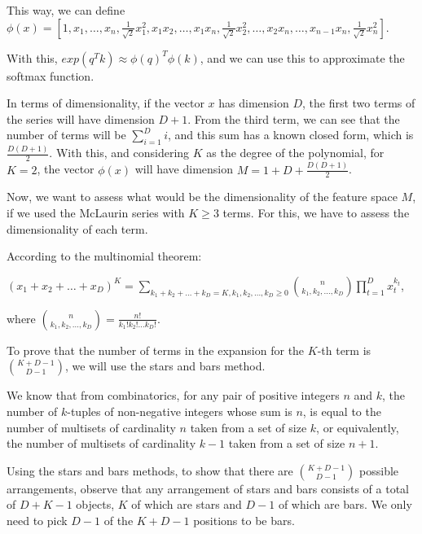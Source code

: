 \documentclass{article}
\begin{document}
This way, we can define $\phi(x) = [1, x_1, \dots, x_n, 
\frac{1}{\sqrt{2}}x_1^{2}, x_1x_2, \dots, x_1x_n, \frac{1}{\sqrt{2}}x_2^{2}, \dots, 
x_2x_n, \dots, x_{n-1}x_n , \frac{1}{\sqrt{2}}x_n^{2}]$.

With this, $exp(q^Tk) \approx \phi(q)^T \phi(k)$, and we can use this to approximate the softmax function.

\bigskip

In terms of dimensionality, if the vector $x$ has dimension $D$, the first two terms of the series will have dimension $D + 1$. From the 
third term, we can see that the number of terms will be $\sum_{i=1}^{D} i$, and this sum has a known closed form, which is $\frac{D(D+1)}{2}$. 
With this, and considering $K$ as the degree of the polynomial, for $K = 2$, the vector $\phi(x)$ will have dimension $M = 1 + D + \frac{D(D+1)}{2}$.

\bigskip

Now, we want to assess what would be the dimensionality of the feature space $M$, if we used the McLaurin series with $K \geq 3$ terms.
For this, we have to assess the dimensionality of each term.

\bigskip

According to the multinomial theorem:

\medskip

$ (x_1 + x_2 + \dots + x_D)^K = \sum_{k_1 + k_2 + \dots + k_D = K, k_1, k_2, \dots, k_D\geq0} \binom{n}{k_1, k_2, \dots, k_D} \prod_{t=1}^D x_t^{k_t}$,

where $\binom{n}{k_1, k_2, \dots, k_D} = \frac{n!}{k_1!k_2!\dots k_D!}$.

\bigskip

To prove that the number of terms in the expansion for the $K$-th term is $\binom{K + D - 1}{D - 1}$, we will use the stars and bars method.

We know that from combinatorics, for any pair of positive integers $n$ and $k$, the number of $k$-tuples of non-negative integers whose sum is $n$, is equal to the number of 
multisets of cardinality $n$ taken from a set of size $k$, or equivalently, the number of multisets of cardinality $k - 1$ taken from a set of size $n + 1$.

Using the stars and bars methods, to show that there are $\binom{K + D -1}{D - 1}$ possible arrangements, observe that any arrangement of stars and bars consists of a 
total of $D + K - 1$ objects, $K$ of which are stars and $D - 1$ of which are bars. We only need to pick $D - 1$ of the $K + D - 1$ 
positions to be bars. 
\end{document}
